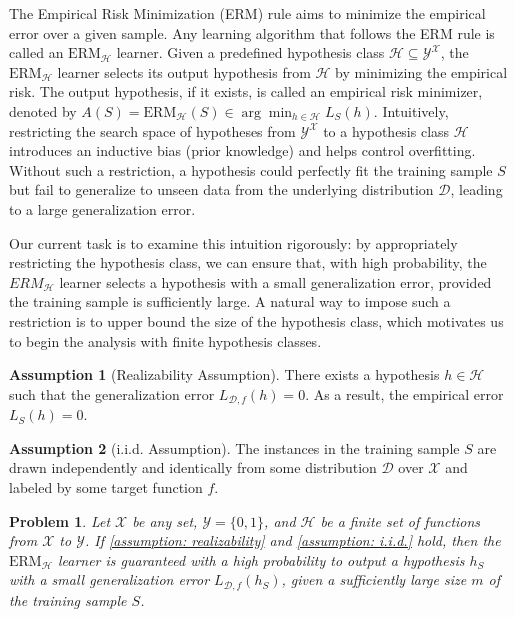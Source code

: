 \documentclass[openany, amssymb, psamsfonts]{amsart}
\newtheorem{prob}{Problem}[section]
\theoremstyle{definition}
\newtheorem{ass}{Assumption}[section]
\numberwithin{equation}{section}
\begin{document}
The Empirical Risk Minimization (ERM) rule aims to minimize the empirical error over a given sample. Any learning algorithm that follows the ERM rule is called an $\mathrm{ERM}_{\mathcal{H}}$ learner. Given a predefined hypothesis class $\mathcal{H} \subseteq \mathcal{Y}^{\mathcal{X}}$, the $\mathrm{ERM}_{\mathcal{H}}$ learner selects its output hypothesis from $\mathcal{H}$ by minimizing the empirical risk. The output hypothesis, if it exists, is called an empirical risk minimizer, denoted by $A(S) = \mathrm{ERM}_{\mathcal{H}}(S) \in \arg\min_{h \in \mathcal{H}} L_S(h)$. Intuitively, restricting the search space of hypotheses from $\mathcal{Y}^{\mathcal X}$ to a hypothesis class $\mathcal{H}$ introduces an inductive bias (prior knowledge) and helps control overfitting. Without such a restriction, a hypothesis could perfectly fit the training sample $S$ but fail to generalize to unseen data from the underlying distribution $\mathcal{D}$, leading to a large generalization error.

Our current task is to examine this intuition rigorously: by appropriately restricting the hypothesis class, we can ensure that, with high probability, the $ERM_{\mathcal{H}}$ learner selects a hypothesis with a small generalization error, provided the training sample is sufficiently large. A natural way to impose such a restriction is to upper bound the size of the hypothesis class, which motivates us to begin the analysis with finite hypothesis classes.

\begin{ass}[Realizability Assumption]\label{assumption: realizability}
There exists a hypothesis $h \in \mathcal{H}$ such that the generalization error $L_{\mathcal{D},f}(h) = 0$. As a result, the empirical error $L_S(h) = 0$.
\end{ass}

\begin{ass}[i.i.d. Assumption]\label{assumption: i.i.d.}
The instances in the training sample $S$ are drawn independently and identically from some distribution $\mathcal{D}$ over $\mathcal{X}$ and labeled by some target function $f$.
\end{ass}

\begin{prob}\label{problem: basic analysis of ERM_H}
Let $\mathcal{X}$ be any set, $\mathcal{Y} = \{0,1\}$, and $\mathcal{H}$ be a finite set of functions from $\mathcal{X}$ to $\mathcal{Y}$.  
If \autoref{assumption: realizability} and \autoref{assumption: i.i.d.} hold, then the $\mathrm{ERM}_{\mathcal{H}}$ learner is guaranteed with a high probability to output a hypothesis $h_S$ with a small \textup{generalization error} $L_{\mathcal{D},f}(h_S)$, given a sufficiently large size $m$ of the training sample $S$.
\end{prob}
\end{document}
